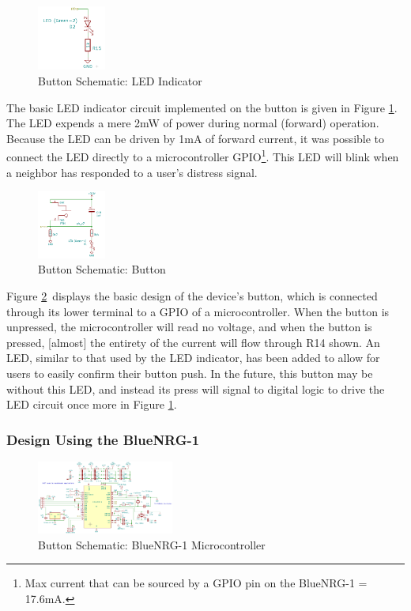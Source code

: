 \documentclass[journal,compsoc]{IEEEtran}
\begin{document}
\begin{figure}[H]
\centering
\includegraphics[width=0.2\textwidth]{buttled.PNG}
\caption{Button Schematic: LED Indicator}
\label{buttled}
\end{figure}

The basic LED indicator circuit implemented on the button is given in Figure \ref{buttled}. The LED expends a mere 2mW of power during normal (forward) operation. Because the LED can be driven by 1mA of forward current, it was possible to connect the LED directly to a microcontroller GPIO\footnote{Max current that can be sourced by a GPIO pin on the BlueNRG-1 = 17.6mA.}.  This LED will blink when a neighbor has responded to a user's distress signal.

\begin{figure}[H]
\centering
\includegraphics[width=0.2\textwidth]{buttbutt.PNG}
\caption{Button Schematic: Button}
\label{buttbutt}
\end{figure}

Figure \ref{buttbutt}~displays the basic design of the device's button, which is connected through its lower terminal to a GPIO of a microcontroller. When the button is unpressed, the microcontroller will read no voltage, and when the button is pressed, [almost] the entirety of the current will flow through R14 shown. An LED, similar to that used by the LED indicator, has been added to allow for users to easily confirm their button push. In the future, this button may be without this LED, and instead its press will signal to digital logic to drive the LED circuit once more in Figure \ref{buttled}.

\subsubsection{Design Using the BlueNRG-1}

\begin{figure}[H]
\centering
\includegraphics[width=0.4\textwidth]{buttmcu.PNG}
\caption{Button Schematic: BlueNRG-1 Microcontroller}
\label{buttuc}
\end{figure}
\end{document}
